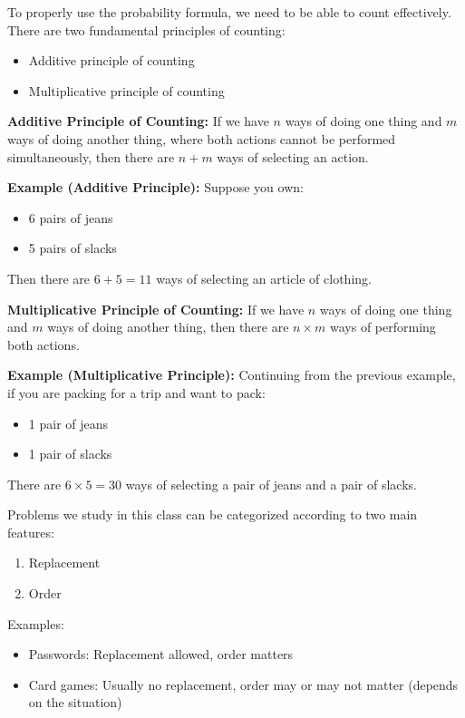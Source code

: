 \documentclass{article}
\begin{document}
To properly use the probability formula, we need to be able to count effectively. There are two fundamental principles of counting:

\begin{itemize}
    \item Additive principle of counting
    \item Multiplicative principle of counting
\end{itemize}

\textbf{Additive Principle of Counting:} If we have $n$ ways of doing one thing and $m$ ways of doing another thing, where both actions cannot be performed simultaneously, then there are $n + m$ ways of selecting an action.

\textbf{Example (Additive Principle):}
Suppose you own:
\begin{itemize}
    \item 6 pairs of jeans
    \item 5 pairs of slacks
\end{itemize}
Then there are $6 + 5 = 11$ ways of selecting an article of clothing.

\textbf{Multiplicative Principle of Counting:} If we have $n$ ways of doing one thing and $m$ ways of doing another thing, then there are $n \times m$ ways of performing both actions.

\textbf{Example (Multiplicative Principle):}
Continuing from the previous example, if you are packing for a trip and want to pack:
\begin{itemize}
    \item 1 pair of jeans
    \item 1 pair of slacks
\end{itemize}
There are $6 \times 5 = 30$ ways of selecting a pair of jeans and a pair of slacks.

Problems we study in this class can be categorized according to two main features:

\begin{enumerate}
    \item Replacement
    \item Order
\end{enumerate}

\noindent
Examples:
\begin{itemize}
    \item Passwords: Replacement allowed, order matters
    \item Card games: Usually no replacement, order may or may not matter (depends on the situation)
\end{itemize}
\end{document}
